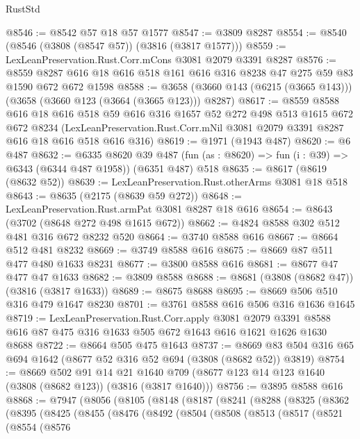 \begin{lexlean}{RustStd}
\begin{coremodule}
@8546 := @8542 @57 @18 @57 @1577
@8547 := @3809 @8287
@8554 := @8540 (@8546 (@3808 (@8547 @57)) (@3816 (@3817 @1577)))
@8559 := LexLeanPreservation.Rust.Corr.mCons @3081 @2079 @3391 @8287
@8576 := @8559 @8287 @616 @18 @616 @518 @161 @616 @316 @8238 @47 @275 @59 @83 @1590 @672 @672 @1598
@8588 := @3658 (@3660 @143 (@6215 (@3665 @143))) (@3658 (@3660 @123 (@3664 (@3665 @123))) @8287)
@8617 := @8559
    @8588
    @616
    @18
    @616
    @518
    @59
    @616
    @316
    @1657
    @52
    @272
    @498
    @513
    @1615
    @672
    @672
    @8234
    (LexLeanPreservation.Rust.Corr.mNil @3081 @2079 @3391 @8287 @616 @18 @616 @518 @616 @316)
@8619 := @1971 (@1943 @487)
@8620 := @6 @487
@8632 := @6335
    @8620
    @39
    @487
    (fun (as : @8620) => fun (i : @39) => @6343 (@6344 @487 @1958))
    (@6351 @487)
    @518
@8635 := @8617 (@8619 (@8632 @52))
@8639 := LexLeanPreservation.Rust.otherArms @3081 @18 @518
@8643 := @8635 (@2175 (@8639 @59 @272))
@8648 := LexLeanPreservation.Rust.armPat @3081 @8287 @18 @616
@8654 := @8643 (@3702 (@8648 @272 @498 @1615 @672))
@8662 := @4824 @8588 @302 @512 @481 @316 @672 @8232 @520
@8664 := @3740 @8588 @616
@8667 := @8664 @512 @481 @8232
@8669 := @3749 @8588 @616
@8675 := @8669 @87 @511 @477 @480 @1633 @8231
@8677 := @3800 @8588 @616
@8681 := @8677 @47 @477 @47 @1633
@8682 := @3809 @8588
@8688 := @8681 (@3808 (@8682 @47)) (@3816 (@3817 @1633))
@8689 := @8675 @8688
@8695 := @8669 @506 @510 @316 @479 @1647 @8230
@8701 := @3761 @8588 @616 @506 @316 @1636 @1645
@8719 := LexLeanPreservation.Rust.Corr.apply
    @3081
    @2079
    @3391
    @8588
    @616
    @87
    @475
    @316
    @1633
    @505
    @672
    @1643
    @616
    @1621
    @1626
    @1630
    @8688
@8722 := @8664 @505 @475 @1643
@8737 := @8669 @83 @504 @316 @65 @694 @1642 (@8677 @52 @316 @52 @694 (@3808 (@8682 @52)) @3819)
@8754 := @8669
    @502
    @91
    @14
    @21
    @1640
    @709
    (@8677 @123 @14 @123 @1640 (@3808 (@8682 @123)) (@3816 (@3817 @1640)))
@8756 := @3895 @8588 @616
@8868 := @7947
    (@8056
      (@8105
        (@8148
          (@8187
            (@8241
              (@8288
                (@8325
                  (@8362
                    (@8395
                      (@8425
                        (@8455
                          (@8476
                            (@8492
                              (@8504
                                (@8508
                                  (@8513
                                    (@8517
                                      (@8521
                                        (@8554
                                          (@8576

\end{coremodule}
\end{lexlean}
